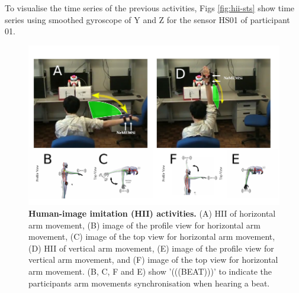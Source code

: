 To visualise the time series of the previous activities, Figs 
\ref{fig:hii-sts} show time series using smoothed gyroscope of Y and Z 
for the sensor HS01 of participant 01.
\begin{figure}
  \centering
  \includegraphics[width=1.0\textwidth]{hii}
    \caption{
	{\bf Human-image imitation (HII) activities.} 
		(A) HII of horizontal arm movement, 
		(B) image of the profile view for horizontal arm movement,
		(C) image of the top view for horizontal arm movement,
		(D) HII of vertical arm movement, 
		(E) image of the profile view for vertical arm movement, and
		(F) image of the top view for horizontal arm movement.
		(B, C, F and E) show '(((BEAT)))' to indicate the participants
		arm movements synchronisation when hearing a beat.
        }
    \label{fig:hii}
\end{figure}
